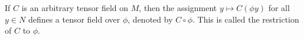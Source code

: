 If $C$ is an arbitrary tensor field on $M$, then the assignment $y \mapsto C(\phi y)$ for all $y \in N$ defines a tensor field over $\phi$, denoted by $C \circ \phi$. This is called the restriction of $C$ to $\phi$.
